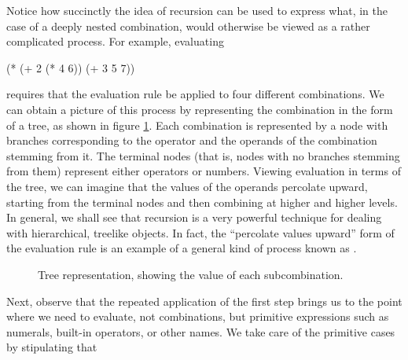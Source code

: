 Notice how succinctly the idea of recursion can be used to express
what, in the case of a deeply nested combination, would otherwise be
viewed as a rather complicated process.  For example, evaluating

\begin{schemedisplay}
(* (+ 2 (* 4 6))
   (+ 3 5 7))
\end{schemedisplay}

\noindent requires that the evaluation rule be applied to four
different combinations.  We can obtain a picture of this process by
representing the combination in the form of a tree, as shown in figure
\ref{fig:1.1}.  Each combination is represented by a node with
branches corresponding to the operator and the operands of the
combination stemming from it.  The terminal nodes (that is, nodes with
no branches stemming from them) represent either operators or numbers.
Viewing evaluation in terms of the tree, we can imagine that the
values of the operands percolate upward, starting from the terminal
nodes and then combining at higher and higher levels.  In general, we
shall see that recursion is a very powerful technique for dealing with
hierarchical, treelike objects.  In fact, the ``percolate values
upward'' form of the evaluation rule is an example of a general kind
of process known as .

\begin{figure}
\caption{Tree representation, showing the value of each subcombination.}
\label{fig:1.1} %
\end{figure}

Next, observe that the repeated application of the first step brings
us to the point where we need to evaluate, not combinations, but
primitive expressions such as numerals, built-in operators, or other
names.  We take care of the primitive cases by stipulating that


